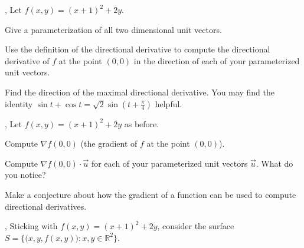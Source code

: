 \documentclass[letter]{article}
\newcommand{\R}{\mathbb{R}}
\renewcommand{\emph}[1]{{\color{defcolor} \textbf{\textit{##1}}}}
\begin{document}
	\sep
	Let $f(x,y) = (x+1)^2+2y$.
	\begin{Enum}
		\item Give a parameterization of all two dimensional unit vectors.
		\item Use the definition of the directional derivative to compute
			the directional derivative of $f$ at the point $(0,0)$ in the
			direction of each of your parameterized unit vectors.
		\item Find the direction of the maximal directional derivative.  You
			may find the identity $\sin t+\cos t = \sqrt{2}\sin(t+\tfrac{\pi}{4})$
			helpful.
	\end{Enum}

	\vspace{-.7cm}
	
	\sep
	Let $f(x,y) = (x+1)^2+2y$ as before.
	\begin{Enum}
		\item Compute $\nabla f(0,0)$ (the gradient of $f$ at the point $(0,0)$).
		\item Compute $\nabla f(0,0)\cdot \vec u$ for each of your parameterized unit vectors $\vec u$.
			What do you notice?
		\item Make a conjecture about how the gradient of a function can be used to compute directional derivatives.
	\end{Enum}

	\sep
	Sticking with $f(x,y) = (x+1)^2+2y$, consider the surface $S=\{\big(x,y,f(x,y)\big):x,y\in\R^2\}$.
\end{document}
